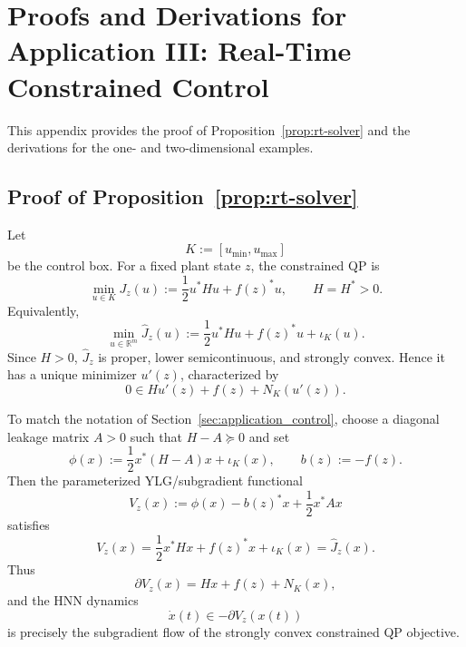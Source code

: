 \documentclass[journal]{IEEEtran}
\theoremstyle{myplain}
\begin{document}
\section{Proofs and Derivations for Application III: Real-Time Constrained Control}
\label{app:control-proofs}

This appendix provides the proof of Proposition~\ref{prop:rt-solver} and the
derivations for the one- and two-dimensional examples.

\subsection{Proof of Proposition~\ref{prop:rt-solver}}

Let
\[
  K:=[u_{\min},u_{\max}]
\]
be the control box. For a fixed plant state \(z\), the constrained QP is
\begin{equation}\label{eq:app-control-qp}
  \min_{u\in K}
  J_z(u):=\frac12 u^*Hu+f(z)^*u,
  \qquad H=H^*>0 .
\end{equation}
Equivalently,
\[
  \min_{u\in\mathbb R^m}
  \widehat J_z(u):=
  \frac12 u^*Hu+f(z)^*u+\iota_K(u).
\]
Since \(H>0\), \(\widehat J_z\) is proper, lower semicontinuous, and strongly
convex. Hence it has a unique minimizer \(u'(z)\), characterized by
\begin{equation}\label{eq:app-control-kkt}
  0\in Hu'(z)+f(z)+N_K(u'(z)).
\end{equation}

To match the notation of Section~\ref{sec:application_control}, choose a
diagonal leakage matrix \(A>0\) such that \(H-A\succeq 0\) and set
\begin{equation}\label{eq:app-control-phi-choice}
  \phi(x):=\frac12 x^*(H-A)x+\iota_K(x),
  \qquad
  b(z):=-f(z).
\end{equation}
Then the parameterized YLG/subgradient functional
\[
  V_z(x):=\phi(x)-b(z)^*x+\frac12 x^*Ax
\]
satisfies
\begin{equation}\label{eq:app-control-V-equals-J}
  V_z(x)
  =
  \frac12 x^*Hx+f(z)^*x+\iota_K(x)
  =
  \widehat J_z(x).
\end{equation}
Thus
\[
  \partial V_z(x)=Hx+f(z)+N_K(x),
\]
and the HNN dynamics
\begin{equation}\label{eq:app-control-flow}
  \dot x(t)\in-\partial V_z(x(t))
\end{equation}
is precisely the subgradient flow of the strongly convex constrained QP
objective.
\end{document}
